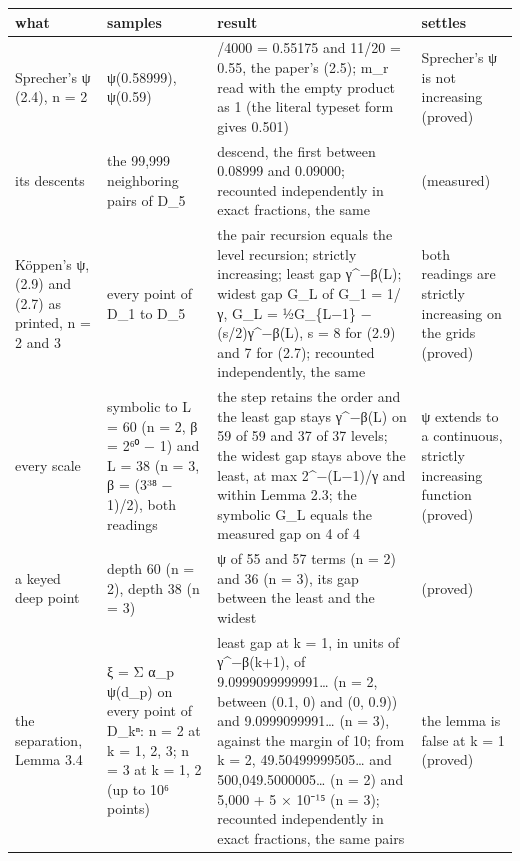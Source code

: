 {\footnotesize
\setlength{\tabcolsep}{6pt}
\begin{longtable}{>{\RaggedRight\arraybackslash}p{}>{\RaggedRight\arraybackslash}p{}>{\RaggedRight\arraybackslash}p{}>{\RaggedRight\arraybackslash}p{}}
\toprule
what & samples & result & settles \\
\midrule
\endhead
Sprecher's ψ (2.4), n = 2 & ψ(0.58999), ψ(0.59) & 2207/4000 = 0.55175 and 11/20 = 0.55, the paper's (2.5); m\_\allowbreak{}r read with the empty product as 1 (the literal typeset form gives 0.501) & Sprecher's ψ is not increasing (proved) \\
its descents & the 99,999 neighboring pairs of D\_\allowbreak{}5 & 10 descend, the first between 0.08999 and 0.09000; recounted independently in exact fractions, the same & (measured) \\
Köppen's ψ, (2.9) and (2.7) as printed, n = 2 and 3 & every point of D\_\allowbreak{}1 to D\_\allowbreak{}5 & the pair recursion equals the level recursion; strictly increasing; least gap γ\textasciicircum{}−β(L); widest gap G\_\allowbreak{}L of G\_\allowbreak{}1 = 1/γ, G\_\allowbreak{}L = ½G\_\allowbreak{}\{L−1\} − (s/2)γ\textasciicircum{}−β(L), s = 8 for (2.9) and 7 for (2.7); recounted independently, the same & both readings are strictly increasing on the grids (proved) \\
every scale & symbolic to L = 60 (n = 2, β = 2⁶⁰ − 1) and L = 38 (n = 3, β = (3³⁸ − 1)/2), both readings & the step retains the order and the least gap stays γ\textasciicircum{}−β(L) on 59 of 59 and 37 of 37 levels; the widest gap stays above the least, at max 2\textasciicircum{}−(L−1)/γ and within Lemma 2.3; the symbolic G\_\allowbreak{}L equals the measured gap on 4 of 4 & ψ extends to a continuous, strictly increasing function (proved) \\
a keyed deep point & depth 60 (n = 2), depth 38 (n = 3) & ψ of 55 and 57 terms (n = 2) and 36 (n = 3), its gap between the least and the widest & (proved) \\
the separation, Lemma 3.4 & ξ = Σ α\_\allowbreak{}p ψ(d\_\allowbreak{}p) on every point of D\_\allowbreak{}kⁿ: n = 2 at k = 1, 2, 3; n = 3 at k = 1, 2 (up to 10⁶ points) & least gap at k = 1, in units of γ\textasciicircum{}−β(k+1), of 9.0999099999991… (n = 2, between (0.1, 0) and (0, 0.9)) and 9.0999099991… (n = 3), against the margin of 10; from k = 2, 49.50499999505… and 500,049.5000005… (n = 2) and 5,000 + 5 × 10⁻¹⁵ (n = 3); recounted independently in exact fractions, the same pairs & the lemma is false at k = 1 (proved) \\

\end{longtable}}
